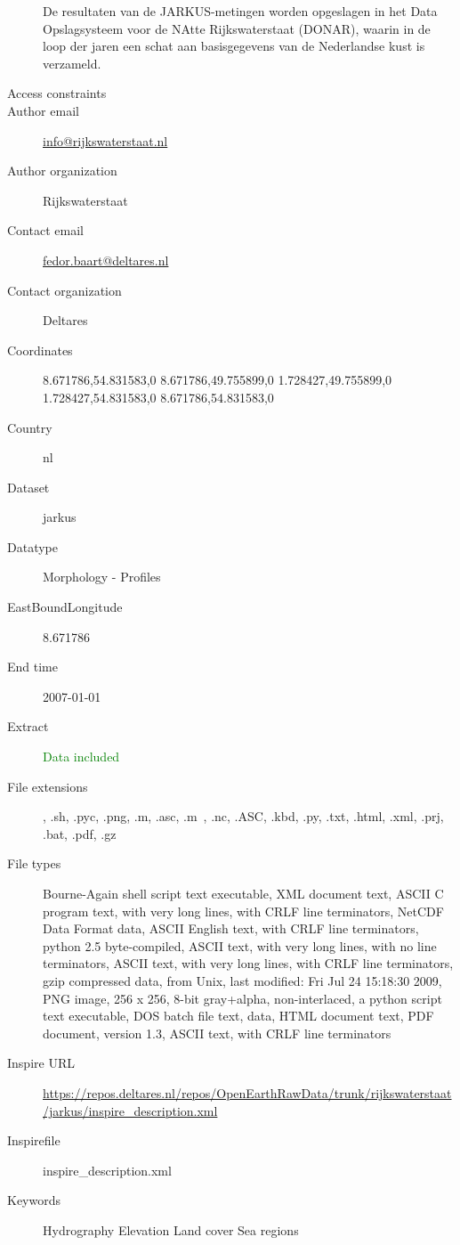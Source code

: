 \documentclass[9]{report}
\begin{document}
\begin{description}
De resultaten van de JARKUS-metingen worden opgeslagen in het Data Opslagsysteem voor de NAtte Rijkswaterstaat (DONAR), waarin in de loop der jaren een schat aan basisgegevens van de Nederlandse kust is verzameld. 
  \item[Access constraints] 
  \item[Author email] \href{mailto:info@rijkswaterstaat.nl}{info@rijkswaterstaat.nl}
  \item[Author organization] Rijkswaterstaat
  \item[Contact email] \href{mailto:fedor.baart@deltares.nl}{fedor.baart@deltares.nl}
  \item[Contact organization] Deltares
  \item[Coordinates] 8.671786,54.831583,0
8.671786,49.755899,0
1.728427,49.755899,0
1.728427,54.831583,0
8.671786,54.831583,0
  \item[Country] nl
  \item[Dataset] jarkus
  \item[Datatype] Morphology - Profiles
  \item[EastBoundLongitude] 8.671786
  \item[End time] 2007-01-01
  \item[Extract] \textcolor{green}{Data included}
  \item[File extensions] , .sh, .pyc, .png, .m, .asc, .m~, .nc, .ASC, .kbd, .py, .txt, .html, .xml, .prj, .bat, .pdf, .gz
  \item[File types] Bourne-Again shell script text executable, XML  document text, ASCII C program text, with very long lines, with CRLF line terminators, NetCDF Data Format data, ASCII English text, with CRLF line terminators, python 2.5 byte-compiled, ASCII text, with very long lines, with no line terminators, ASCII text, with very long lines, with CRLF line terminators, gzip compressed data, from Unix, last modified: Fri Jul 24 15:18:30 2009, PNG image, 256 x 256, 8-bit gray+alpha, non-interlaced, a python script text executable, DOS batch file text, data, HTML document text, PDF document, version 1.3, ASCII text, with CRLF line terminators
  \item[Inspire URL] \href{https://repos.deltares.nl/repos/OpenEarthRawData/trunk/rijkswaterstaat/jarkus/inspire\_description.xml}{https://repos.deltares.nl/repos/OpenEarthRawData/trunk/rijkswaterstaat/jarkus/inspire\_description.xml}
  \item[Inspirefile] inspire\_description.xml
  \item[Keywords] Hydrography Elevation Land cover Sea regions

\end{description}
\end{document}
